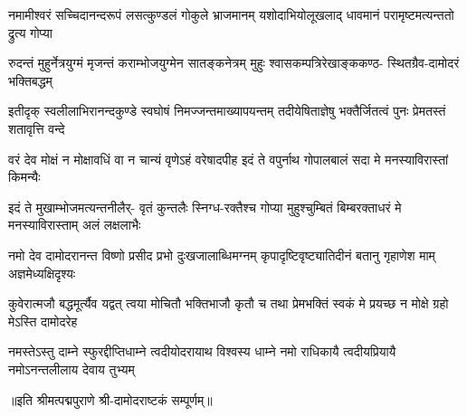 
\fourlineindentedshloka
{नमामीश्वरं सच्चिदानन्दरूपं}
{लसत्कुण्डलं गोकुले भ्राजमानम्}
{यशोदाभियोलूखलाद् धावमानं}
{परामृष्टमत्यन्ततो द्रुत्य गोप्या}

\fourlineindentedshloka
{रुदन्तं मुहुर्नेत्रयुग्मं मृजन्तं}
{कराम्भोजयुग्मेन सातङ्कनेत्रम्}
{मुहुः श्वासकम्पत्रिरेखाङ्ककण्ठ-}
{स्थितग्रैव-दामोदरं भक्तिबद्धम्}

\fourlineindentedshloka
{इतीदृक् स्वलीलाभिरानन्दकुण्डे}
{स्वघोषं निमज्जन्तमाख्यापयन्तम्}
{तदीयेषिताज्ञेषु भक्तैर्जितत्वं}
{पुनः प्रेमतस्तं शतावृत्ति वन्दे}

\fourlineindentedshloka
{वरं देव मोक्षं न मोक्षावधिं वा}
{न चान्यं वृणेऽहं वरेषादपीह}
{इदं ते वपुर्नाथ गोपालबालं}
{सदा मे मनस्याविरास्तां किमन्यैः}

\fourlineindentedshloka
{इदं ते मुखाम्भोजमत्यन्तनीलैर्-}
{वृतं कुन्तलैः स्निग्ध-रक्तैश्च गोप्या}
{मुहुश्चुम्बितं बिम्बरक्ताधरं मे}
{मनस्याविरास्ताम् अलं लक्षलाभैः}

\fourlineindentedshloka
{नमो देव दामोदरानन्त विष्णो}
{प्रसीद प्रभो दुःखजालाब्धिमग्नम्}
{कृपादृष्टिवृष्ट्यातिदीनं बतानु}
{गृहाणेश माम् अज्ञमेध्यक्षिदृश्यः}

\fourlineindentedshloka
{कुवेरात्मजौ बद्धमूर्त्यैव यद्वत्}
{त्वया मोचितौ भक्तिभाजौ कृतौ च}
{तथा प्रेमभक्तिं स्वकं मे प्रयच्छ}
{न मोक्षे ग्रहो मेऽस्ति दामोदरेह}

\fourlineindentedshloka
{नमस्तेऽस्तु दाम्ने स्फुरद्दीप्तिधाम्ने}
{त्वदीयोदरायाथ विश्वस्य धाम्ने}
{नमो राधिकायै त्वदीयप्रियायै}
{नमोऽनन्तलीलाय देवाय तुभ्यम्}

॥इति श्रीमत्पद्मपुराणे श्री-दामोदराष्टकं सम्पूर्णम्॥